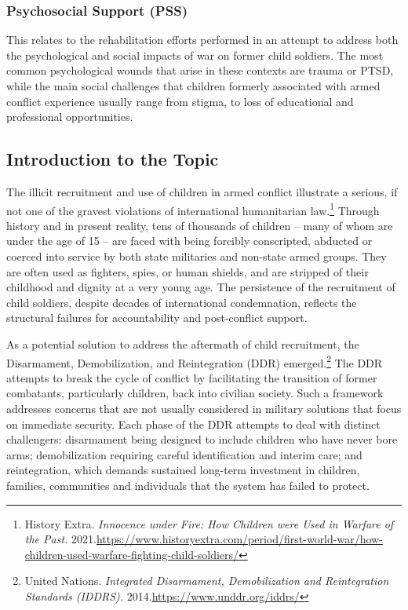 \subsubsection{Psychosocial Support (PSS)}

This relates to the rehabilitation efforts performed in an attempt to address both the psychological and social impacts of war on former child soldiers. The most common psychological wounds that arise in these contexts are trauma or PTSD, while the main social challenges that children formerly associated with armed conflict experience usually range from stigma, to loss of educational and professional opportunities.

\subsection{Introduction to the Topic}

The illicit recruitment and use of children in armed conflict illustrate a serious, if not one of the gravest violations of international humanitarian law.\footnote{History Extra. \emph{Innocence under Fire: How Children were Used in Warfare of the Past.} 2021.\url{https://www.historyextra.com/period/first-world-war/how-children-used-warfare-fighting-child-soldiers/}}  Through history and in present reality, tens of thousands of children – many of whom are under the age of 15 – are faced with being forcibly conscripted, abducted or coerced into service by both state militaries and non-state armed groups. They are often used as fighters, spies, or human shields, and are stripped of their childhood and dignity at a very young age. The persistence of the recruitment of child soldiers, despite decades of international condemnation, reflects the structural failures for accountability and post-conflict support.

As a potential solution to address the aftermath of child recruitment, the Disarmament, Demobilization, and Reintegration (DDR) emerged.\footnote{United Nations. \emph{Integrated Disarmament, Demobilization and Reintegration Standards (IDDRS).} 2014.\url{https://www.unddr.org/iddrs/}} The DDR attempts to break the cycle of conflict by facilitating the transition of former combatants, particularly children, back into civilian society. Such a framework addresses concerns that are not usually considered in military solutions that focus on immediate security. Each phase of the DDR attempts to deal with distinct challengers: disarmament being designed to include children who have never bore arms; demobilization requiring careful identification and interim care; and reintegration, which demands sustained long-term investment in children, families, communities and individuals that the system has failed to protect.

